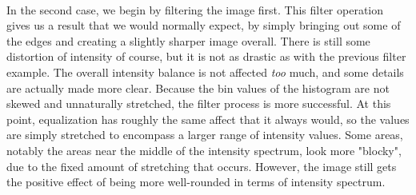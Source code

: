 \documentclass[11pt]{article}
\begin{document}
\\
In the second case, we begin by filtering the image first. This filter operation gives us a result that we would normally expect, by simply bringing out some of the edges and creating a slightly sharper image overall. There is still some distortion of intensity of course, but it is not as drastic as with the previous filter example. The overall intensity balance is not affected \textit{too} much, and some details are actually made more clear. Because the bin values of the histogram are not skewed and unnaturally stretched, the filter process is more successful. At this point, equalization has roughly the same affect that it always would, so the values are simply stretched to encompass a larger range of intensity values. Some areas, notably the areas near the middle of the intensity spectrum, look more "blocky", due to the fixed amount of stretching that occurs. However, the image still gets the positive effect of being more well-rounded in terms of intensity spectrum.
\end{document}

